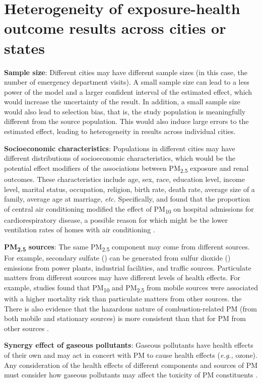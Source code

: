 \documentclass[11pt]{article}
\newcommand{\tsub}{\textsubscript}
\begin{document}
\section{Heterogeneity of exposure-health outcome results across cities or states}
\begin{enumerate*}[{[1)]}]
    \item \textbf{Sample size}: Different cities may have different sample sizes (in this case, the number of emergency department visits). A small sample size can lead to a less power of the model and a larger confident interval of the estimated effect, which would increase the uncertainty of the result. In addition, a small sample size would also lead to selection bias, that is, the study population is meaningfully different from the source population. This would also induce large errors to the estimated effect, leading to heterogeneity in results across individual cities. 
    \item \textbf{Socioeconomic characteristics}: Populations in different cities may have different distributions of socioeconomic characteristics, which would be the potential effect modifiers of the associations between PM\tsub{2.5} exposure and renal outcomes. These characteristics include age, sex, race, education level, income level, marital status, occupation, religion, birth rate, death rate, average size of a family, average age at marriage, \textit{etc.} Specifically, \citet{janssen2002air} and \citet{medina2006effect} found that the proportion of central air conditioning modified the effect of PM\tsub{10} on hospital admissions for cardiorespiratory disease, a possible reason for which might be the lower ventilation rates of homes with air conditioning \citep{suh1992personal}. 
    \item \textbf{PM\tsub{2.5} sources}: The same PM\tsub{2.5} component may come from different sources. For example, secondary sulfate () can be generated from sulfur dioxide () emissions from power plants, industrial facilities, and traffic sources. Particulate matters from different sources may have different levels of health effects. For example, studies \citep{laden2000association, zeka2005short} found that PM\tsub{10} and PM\tsub{2.5} from mobile sources were associated with a higher mortality risk than particulate matters from other sources. the There is also evidence that the hazardous nature of combustion-related PM (from both mobile and stationary sources) is more consistent than that for PM from other sources \citep{world2007health}.
    \item \textbf{Synergy effect of gaseous pollutants}: Gaseous pollutants have health effects of their own and may act in concert with PM to cause health effects (\textit{e.g.,} ozone). Any consideration of the health effects of different components and sources of PM must consider how gaseous pollutants may affect the toxicity of PM constituents \citep{adams2015particulate}.

\end{enumerate*}
\end{document}
